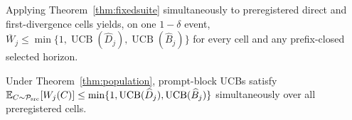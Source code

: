 \begin{corollary}
\label{cor:fixedsuite}
Applying Theorem~\ref{thm:fixedsuite} simultaneously to preregistered direct and first-divergence cells yields, on one $1-\delta$ event,
$\overline W_j\le\min\{1,\operatorname{UCB}(\widehat D_j),\operatorname{UCB}(\widehat B_j)\}$ for every cell and any prefix-closed selected horizon.
\end{corollary}

\begin{corollary}
\label{cor:population}
Under Theorem~\ref{thm:population}, prompt-block UCBs satisfy
$\mathbb{E}_{C\sim\mathcal{P}_{\mathrm{src}}}[W_j(C)]\le\min\{1,\operatorname{UCB}(\widehat D_j),\operatorname{UCB}(\widehat B_j)\}$ simultaneously over all preregistered cells.
\end{corollary}
